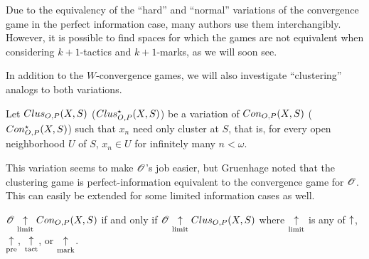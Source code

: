 Due to the equivalency of the ``hard'' and ``normal'' variations of the
convergence game in the perfect information case, many authors use them
interchangibly. However, it is possible to find spaces for which the games are
not equivalent when considering $k+1$-tactics and $k+1$-marks, as we will
soon see.

In addition to the $W$-convergence games, we will also investigate
``clustering'' analogs to both variations.

\begin{game}
  Let $Clus_{O,P}(X,S)$ ($Clus_{O,P}^\star(X,S)$) be a variation of
  $Con_{O,P}(X,S)$ ($Con_{O,P}^\star(X,S)$) such that $x_n$ need only
  cluster at $S$, that is, for every open neighborhood $U$ of $S$, $x_n\in U$
  for infinitely many $n<\omega$.
\end{game}

This variation seems to make $\mathscr{O}$'s job easier, but Gruenhage noted that
the clustering game is perfect-information equivalent to the convergence game
for $\mathscr{O}$. This can easily be extended for some limited information cases
as well.

\begin{prop}
  $\mathscr{O} \underset{\text{limit}}{\uparrow} Con_{O,P}(X,S)$
    if and only if
  $\mathscr{O} \underset{\text{limit}}{\uparrow} Clus_{O,P}(X,S)$
  where $\underset{\text{limit}}{\uparrow}$ is any of $\uparrow$, $\underset{\text{pre}}{\uparrow}$, $\underset{\text{tact}}{\uparrow}$, or $\underset{\text{mark}}{\uparrow}$.
\end{prop}

